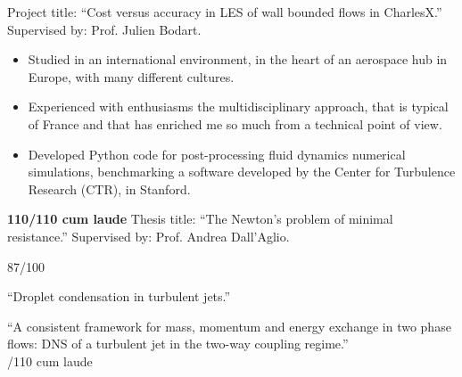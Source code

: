 	\divider

	Project title: ``Cost versus accuracy in LES of wall bounded flows in CharlesX.'' Supervised by: Prof. Julien Bodart. \\
	\medskip
	\begin{itemize}
		\item Studied in an international environment, in the heart of an aerospace hub in Europe, with many different cultures.
		\item Experienced with enthusiasms the multidisciplinary  approach, that is typical of France and that has enriched me so much from a technical point of view.
		\item Developed Python code for post-processing fluid dynamics numerical simulations, benchmarking a software developed by the Center for Turbulence Research (CTR), in Stanford.
	\end{itemize}
	\medskip

	\divider

	\textbf{110/110 cum laude} Thesis title: ``The Newton's problem of minimal resistance.'' Supervised by: Prof. Andrea Dall'Aglio. \\
	\medskip
	\cvtag{\LaTeX}

	\divider

	87/100

\else

	``Droplet condensation in turbulent jets.'' \\
	\medskip

	\divider

	``A consistent framework for mass, momentum and energy exchange in two phase flows: DNS of a turbulent jet in the two-way coupling regime.'' \\
	/110 cum laude \\
	\medskip

